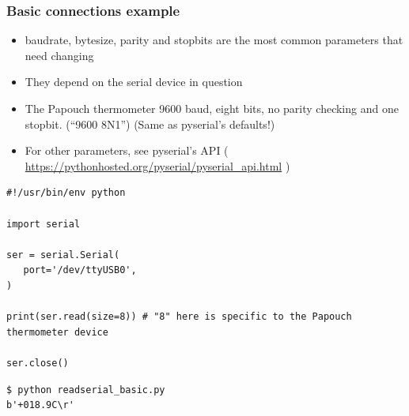 \documentclass[aspectratio=1610,9pt]{beamer} %
\begin{document}
\begin{frame}[fragile]
\frametitle{Basic connections example}

\begin{itemize}[<+->]
\itemsep1pt\parskip0pt
\item<1->
  baudrate, bytesize, parity and stopbits are the most common parameters
  that need changing
\item<2->
  They depend on the serial device in question
\item<3->
  The Papouch thermometer 9600 baud, eight bits, no parity checking and
  one stopbit. (``9600 8N1'') (Same as pyserial's defaults!)
\item<4->
  For other parameters, see pyserial's API (
  \href{https://pythonhosted.org/pyserial/pyserial_api.html}{https://pythonhosted.org/pyserial/pyserial\_api.html}
  )
\end{itemize}
\end{frame}
\begin{frame}[fragile]

\begin{verbatim}
#!/usr/bin/env python

import serial

ser = serial.Serial(
   port='/dev/ttyUSB0',
)

print(ser.read(size=8)) # "8" here is specific to the Papouch thermometer device

ser.close()
\end{verbatim}

\begin{verbatim}
$ python readserial_basic.py
b'+018.9C\r'
\end{verbatim}

\end{frame}
\end{document}
